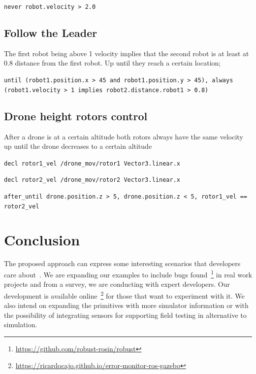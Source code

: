 \documentclass[runningheads]{llncs}
\begin{document}
\vspace{3mm}

\texttt{never robot.velocity > 2.0}

\subsection{Follow the Leader}

The first robot being above 1 velocity implies that the second robot is at least at 0.8 distance from the first robot. Up until they reach a certain location;

\vspace{3mm}

\texttt{until (robot1.position.x > 45 and robot1.position.y > 45), always (robot1.velocity > 1 implies robot2.distance.robot1 > 0.8)}


\subsection{Drone height rotors control}

After a drone is at a certain altitude both rotors always have the same velocity up until the drone decreases to a certain altitude

\vspace{3mm}

\texttt{decl rotor1\_vel /drone\_mov/rotor1 Vector3.linear.x}

\texttt{decl rotor2\_vel /drone\_mov/rotor2 Vector3.linear.x}

\vspace{3mm}

\texttt{after\_until drone.position.z > 5, drone.position.z < 5, rotor1\_vel == rotor2\_vel}



\section{Conclusion}

The proposed approach can express some interesting scenarios that developers care about~. We are expanding our examples to include bugs found~\footnote{\url{https://github.com/robust-rosin/robust}} in real work projects and from a survey, we are conducting with expert developers. Our development is available online~\footnote{\url{https://ricardocajo.github.io/error-monitor-ros-gazebo}} for those that want to experiment with it. We also intend on expanding the primitives with more simulator information or with the possibility of integrating sensors for supporting field testing in alternative to simulation.
\end{document}
